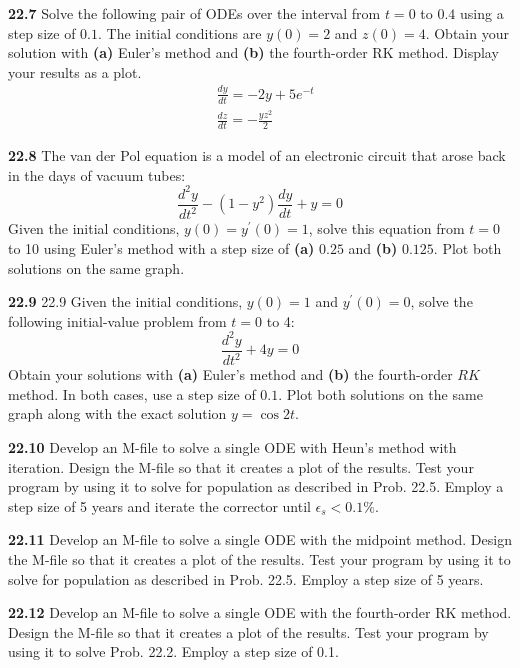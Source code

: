 \documentclass[../main.tex]{subfiles}
\begin{document}
\begin{multicols}{2}
    \noindent\textbf{22.7} Solve the following pair of ODEs over the interval from $t=0$ to $0.4$ using a step size of $0.1$. The initial conditions are $y(0)=2$ and $z(0)=4$. Obtain your solution with \textbf{(a)} Euler's method and \textbf{(b)} the fourth-order RK method. Display your results as a plot.
    $$
    \begin{aligned}
    &\frac{d y}{d t}=-2 y+5 e^{-t} \\
    &\frac{d z}{d t}=-\frac{y z^{2}}{2}
    \end{aligned}
    $$\vspace{2mm}

    \noindent\textbf{22.8} The van der Pol equation is a model of an electronic circuit that arose back in the days of vacuum tubes:
    $$
    \frac{d^{2} y}{d t^{2}}-\left(1-y^{2}\right) \frac{d y}{d t}+y=0
    $$
    Given the initial conditions, $y(0)=y^{\prime}(0)=1$, solve this equation from $t=0$ to 10 using Euler's method with a step size of \textbf{(a)} $0.25$ and \textbf{(b)} $0.125$. Plot both solutions on the same graph.\vspace{2mm}

    \noindent\textbf{22.9} 22.9 Given the initial conditions, $y(0)=1$ and $y^{\prime}(0)=0$, solve the following initial-value problem from $t=0$ to 4:
    $$
    \frac{d^{2} y}{d t^{2}}+4 y=0
    $$ Obtain your solutions with \textbf{(a)} Euler's method and \textbf{(b)} the fourth-order $R K$ method. In both cases, use a step size of $0.1$. Plot both solutions on the same graph along with the exact solution $y=\cos 2 t$.\vspace{2mm}

    \noindent\textbf{22.10} Develop an M-file to solve a single ODE with Heun's
    method with iteration. Design the M-file so that it creates a
    plot of the results. Test your program by using it to solve for
    population as described in Prob. 22.5. Employ a step size of
    5 years and iterate the corrector until $\epsilon_s < 0.1\%$.\vspace{2mm}

    \noindent\textbf{22.11} Develop an M-file to solve a single ODE with the
    midpoint method. Design the M-file so that it creates a plot
    of the results. Test your program by using it to solve for population as described in Prob. 22.5. Employ a step size of
    5 years.\vspace{2mm}

    \noindent\textbf{22.12} Develop an M-file to solve a single ODE with the
    fourth-order RK method. Design the M-file so that it creates
    a plot of the results. Test your program by using it to solve
    Prob. 22.2. Employ a step size of 0.1.\vspace{2mm}


\end{multicols}
\end{document}
